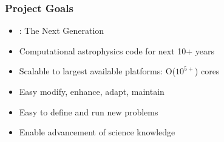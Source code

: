 \begin{frame}[fragile] \frametitle{Project Goals}
   \begin{itemize}
      \item{} \enzo: The Next Generation
      \item{} Computational astrophysics code for next 10+ years
      \item{} Scalable to largest available platforms: O($10^{5+}$)  cores
      \item{} Easy modify, enhance, adapt, maintain
      \item{} Easy to define and run new problems
      \item{} Enable advancement of science knowledge
   \end{itemize}
\end{frame}
